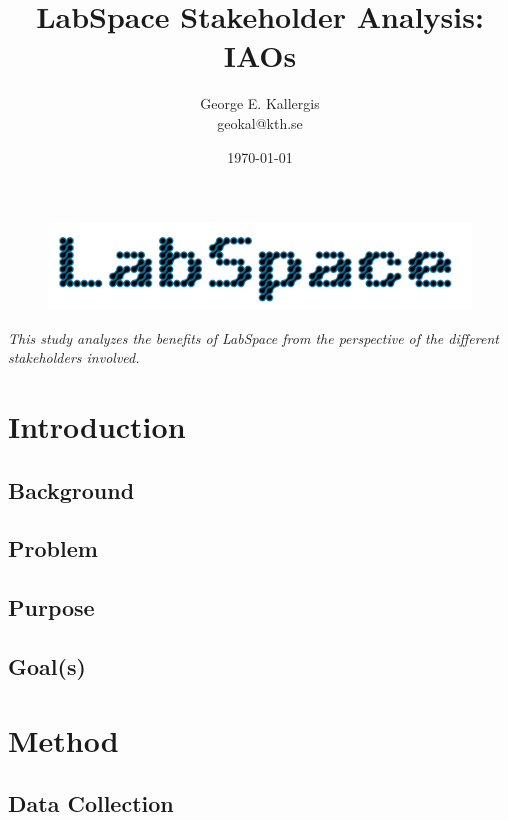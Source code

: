 \documentclass[a4paper, 11pt]{article}
\title{LabSpace Stakeholder Analysis: IAOs}
\author{George E. Kallergis\\geokal@kth.se}
\date{\today{}}
\begin{document}
\maketitle

\begin{figure}[h!]
  \begin{center}
    \includegraphics[width=\textwidth,height=\textheight,keepaspectratio]{imagery/logo.png}
    \label{fig:dneaf}
  \end{center}
\end{figure}

\textit{This study analyzes the benefits of LabSpace from the perspective of the different stakeholders involved.}

\newpage

\section{Introduction}

\subsection{Background}

\subsection{Problem}

\subsection{Purpose}

\subsection{Goal(s)}

\section{Method}

\subsection{Data Collection}
\end{document}
